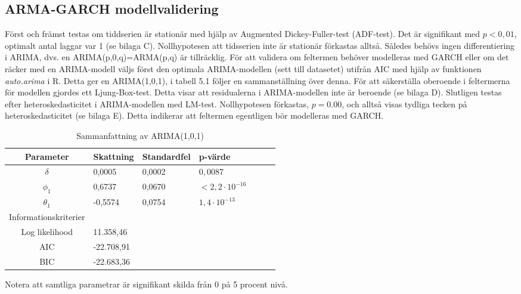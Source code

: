 \documentclass[11pt]{article}
\numberwithin{equation}{section}
\numberwithin{table}{section}
\numberwithin{figure}{section}
\begin{document}
\subsection{ARMA-GARCH modellvalidering}
Först och främst testas om tiddserien är stationär med hjälp av Augmented Dickey-Fuller-test (ADF-test). Det är signifikant med $p<0,01$, optimalt antal laggar var 1 (se bilaga C). Nollhypotesen att tidsserien inte är stationär förkastas alltså. Således behövs ingen differentiering i ARIMA, dvs. en ARIMA(p,0,q)=ARMA(p,q) är tillräcklig. För att validera om feltermen behöver modelleras med GARCH eller om det räcker med en ARIMA-modell väljs först den optimala ARIMA-modellen (sett till datasetet) utifrån AIC med hjälp av funktionen \textit{auto.arima} i R. Detta ger en ARIMA(1,0,1), i tabell 5.1 följer en sammanställning över denna. För att säkerställa oberoende i feltermerna för modellen gjordes ett Ljung-Box-test. Detta visar att residualerna i ARIMA-modellen inte är beroende (se bilaga D). Slutligen testas efter heteroskedasticitet i ARIMA-modellen med LM-test. Nollhypotesen förkastas, $p=0.00$, och alltså visas tydliga tecken på heteroskedasticitet (se bilaga E). Detta indikerar att feltermen egentligen bör modelleras med GARCH. 

\begin{table}[H]
\caption{Sammanfattning av ARIMA(1,0,1)}
\begin{tabularx}{\textwidth}{c *{6}{Y}}
\toprule

Parameter  & Skattning & Standardfel & p-värde \\
\hline

$\delta$        & 0,0005  & 0,0002  & $0,0087$   \\
$\phi_1$        & 0,6737  & 0,0670  & $<2,2\cdot10^{-16}$   \\

$\theta_1$      & -0,5574 & 0,0754  &  $1,4\cdot10^{-13}$   \\
\midrule

Informationskriterier  & &  &  \\
\hline

Log likelihood        & 11.358,46 \\
AIC                   & -22.708,91 \\

BIC                   & -22.683,36 \\
\bottomrule
\end{tabularx}
\footnotesize{Notera att samtliga parametrar är signifikant skilda från 0 på 5 procent nivå.}
\end{table}
\end{document}
